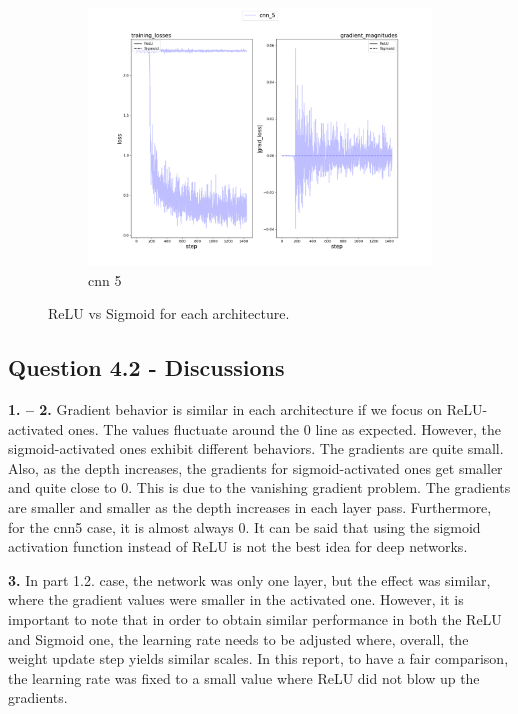 \documentclass{assignment}
\begin{document}
\begin{figure}[!htb]
\begin{subfigure}{0.3\textwidth}
        \includegraphics[width=\textwidth]{figures/part4_alpha_cnn_5.png}
        \caption{cnn 5}
    \end{subfigure}\hfill
    \caption{ReLU vs Sigmoid for each architecture.}
    \label{fig:q4_ind}
\end{figure}

\subsection*{Question 4.2 - Discussions}

\textbf{1. -- 2.}
\noindent Gradient behavior is similar in each architecture if we focus on ReLU-activated ones. The values fluctuate around the 0 line as expected. However, the sigmoid-activated ones exhibit different behaviors. The gradients are quite small. Also, as the depth increases, the gradients for sigmoid-activated ones get smaller and quite close to 0. This is due to the vanishing gradient problem. The gradients are smaller and smaller as the depth increases in each layer pass. Furthermore, for the cnn5 case, it is almost always 0. It can be said that using the sigmoid activation function instead of ReLU is not the best idea for deep networks.

\textbf{3.}
\noindent In part 1.2. case, the network was only one layer, but the effect was similar, where the gradient values were smaller in the activated one. However, it is important to note that in order to obtain similar performance in both the ReLU and Sigmoid one, the learning rate needs to be adjusted where, overall, the weight update step yields similar scales. In this report, to have a fair comparison, the learning rate was fixed to a small value where ReLU did not blow up the gradients.
\end{document}
